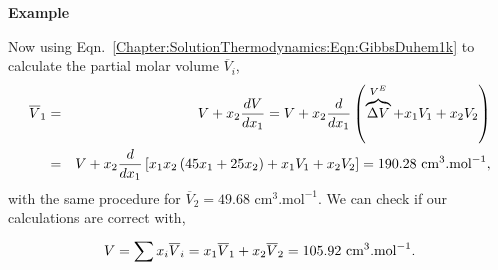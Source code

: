 \begin{MyExample}{\begin{center}{\bf Example}\end{center}}
              Now using Eqn.~\ref{Chapter:SolutionThermodynamics:Eqn:GibbsDuhem1k} to calculate the partial molar volume $\overline{V}_{i}$,
                 \begin{eqnarray}
                    \overline{V}_{1} &=& V + x_{2}\frc{dV}{dx_{1}} = V + x_{2}\frc{d}{dx_{1}} \left(\overbrace{\Delta V}^{V^{E}} + x_{1}V_{1} + x_{2}V_{2}\right) \nonumber \\
                         &=& V + x_{2}\frc{d}{dx_{1}} \left[x_{1}x_{2}\left(45x_{1}+25x_{2}\right)+x_{1}V_{1}+x_{2}V_{2}\right] = 190.28\text{ cm}^{3}.\text{mol}^{-1}, \nonumber
                 \end{eqnarray}
              with the same procedure for $\overline{V}_{2}=49.68\text{ cm}^{3}.\text{mol}^{-1}$. We can check if our calculations are correct with,
                 \begin{displaymath}
                      V = \summation[x_{i}\overline{V}_{i}]{}{} = x_{1}\overline{V}_{1} + x_{2}\overline{V}_{2} = 105.92\text{ cm}^{3}.\text{mol}^{-1}.
                 \end{displaymath}
           
   \end{MyExample} 
     
